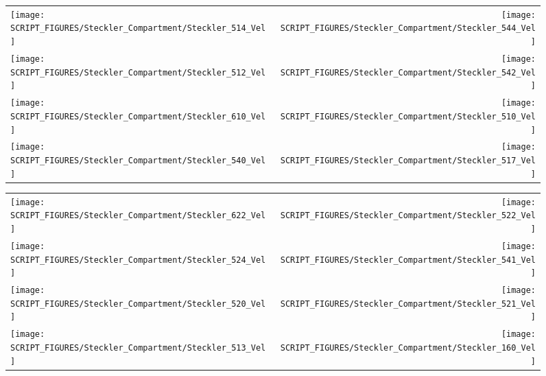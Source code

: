 \begin{figure}[p]
\begin{tabular*}{\textwidth}{l@{\extracolsep{\fill}}r}
\texttt{[image: SCRIPT\_FIGURES/Steckler\_Compartment/Steckler\_514\_Vel]} &
\texttt{[image: SCRIPT\_FIGURES/Steckler\_Compartment/Steckler\_544\_Vel]} \\
\texttt{[image: SCRIPT\_FIGURES/Steckler\_Compartment/Steckler\_512\_Vel]} &
\texttt{[image: SCRIPT\_FIGURES/Steckler\_Compartment/Steckler\_542\_Vel]} \\
\texttt{[image: SCRIPT\_FIGURES/Steckler\_Compartment/Steckler\_610\_Vel]} &
\texttt{[image: SCRIPT\_FIGURES/Steckler\_Compartment/Steckler\_510\_Vel]} \\
\texttt{[image: SCRIPT\_FIGURES/Steckler\_Compartment/Steckler\_540\_Vel]} &
\texttt{[image: SCRIPT\_FIGURES/Steckler\_Compartment/Steckler\_517\_Vel]}
\end{tabular*}
\label{Steckler_Vel_5}
\end{figure}

\begin{figure}[p]
\begin{tabular*}{\textwidth}{l@{\extracolsep{\fill}}r}
\texttt{[image: SCRIPT\_FIGURES/Steckler\_Compartment/Steckler\_622\_Vel]} &
\texttt{[image: SCRIPT\_FIGURES/Steckler\_Compartment/Steckler\_522\_Vel]} \\
\texttt{[image: SCRIPT\_FIGURES/Steckler\_Compartment/Steckler\_524\_Vel]} &
\texttt{[image: SCRIPT\_FIGURES/Steckler\_Compartment/Steckler\_541\_Vel]} \\
\texttt{[image: SCRIPT\_FIGURES/Steckler\_Compartment/Steckler\_520\_Vel]} &
\texttt{[image: SCRIPT\_FIGURES/Steckler\_Compartment/Steckler\_521\_Vel]} \\
\texttt{[image: SCRIPT\_FIGURES/Steckler\_Compartment/Steckler\_513\_Vel]} &
\texttt{[image: SCRIPT\_FIGURES/Steckler\_Compartment/Steckler\_160\_Vel]}
\end{tabular*}
\label{Steckler_Vel_6}
\end{figure}

